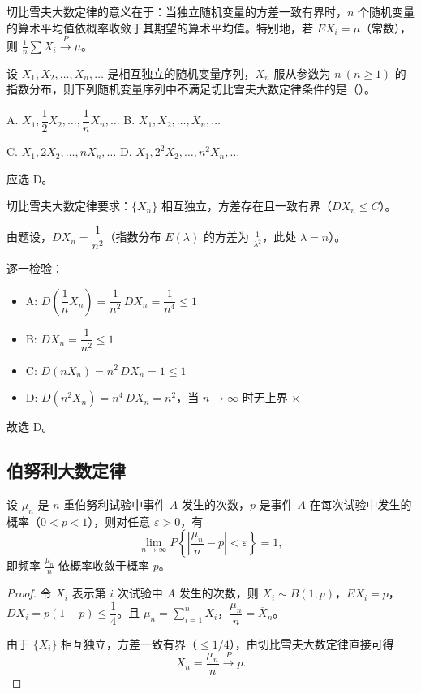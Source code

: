 \documentclass[lang=cn,11pt]{elegantbook}
\begin{document}
\begin{note}
切比雪夫大数定律的意义在于：当独立随机变量的方差一致有界时，\(n\) 个随机变量的算术平均值依概率收敛于其期望的算术平均值。特别地，若 \(EX_i = \mu\)（常数），则 \(\frac{1}{n}\sum X_i \stackrel{P}{\longrightarrow} \mu\)。
\end{note}

\begin{exercise}\label{exer:5-lln-exponential}
设 \(X_1, X_2, \dots, X_n, \dots\) 是相互独立的随机变量序列，\(X_n\) 服从参数为 \(n\ (n \geq 1)\) 的指数分布，则下列随机变量序列中\textbf{不}满足切比雪夫大数定律条件的是（\quad）。\par
A. \(X_1, \dfrac{1}{2}X_2, \dots, \dfrac{1}{n}X_n, \dots\)\quad
B. \(X_1, X_2, \dots, X_n, \dots\)\par
C. \(X_1, 2X_2, \dots, nX_n, \dots\)\quad
D. \(X_1, 2^2X_2, \dots, n^2X_n, \dots\)
\end{exercise}

\begin{solution}
应选 D。

切比雪夫大数定律要求：\(\{X_n\}\) 相互独立，方差存在且一致有界（\(DX_n \leq C\)）。

由题设，\(DX_n = \dfrac{1}{n^2}\)（指数分布 \(E(\lambda)\) 的方差为 \(\frac{1}{\lambda^2}\)，此处 \(\lambda = n\)）。

逐一检验：
\begin{itemize}
    \item A: \(D\!\left(\dfrac{1}{n}X_n\right) = \dfrac{1}{n^2}\,DX_n = \dfrac{1}{n^4} \leq 1\) \checkmark
    \item B: \(DX_n = \dfrac{1}{n^2} \leq 1\) \checkmark
    \item C: \(D(nX_n) = n^2\,DX_n = 1 \leq 1\) \checkmark
    \item D: \(D(n^2 X_n) = n^4\,DX_n = n^2\)，当 \(n \to \infty\) 时无上界 \(\times\)
\end{itemize}
故选 D。
\end{solution}

\subsection{伯努利大数定律}

\begin{theorem}[伯努利大数定律] \label{thm:bernoulli-lln}
设 \(\mu_n\) 是 \(n\) 重伯努利试验中事件 \(A\) 发生的次数，\(p\) 是事件 \(A\) 在每次试验中发生的概率（\(0 < p < 1\)），则对任意 \(\varepsilon > 0\)，有
\[
\lim_{n\to\infty} P\!\left\{\left|\frac{\mu_n}{n} - p\right| < \varepsilon\right\} = 1,
\]
即频率 \(\frac{\mu_n}{n}\) 依概率收敛于概率 \(p\)。
\end{theorem}
\begin{proof}
令 \(X_i\) 表示第 \(i\) 次试验中 \(A\) 发生的次数，则 \(X_i \sim B(1,p)\)，\(EX_i = p\)，\(DX_i = p(1-p) \leq \dfrac{1}{4}\)。且 \(\mu_n = \sum_{i=1}^{n} X_i\)，\(\dfrac{\mu_n}{n} = \overline{X}_n\)。

由于 \(\{X_i\}\) 相互独立，方差一致有界（\(\leq 1/4\)），由切比雪夫大数定律直接可得
\[
\overline{X}_n = \frac{\mu_n}{n} \xrightarrow{P} p.
\]
\end{proof}
\end{document}

